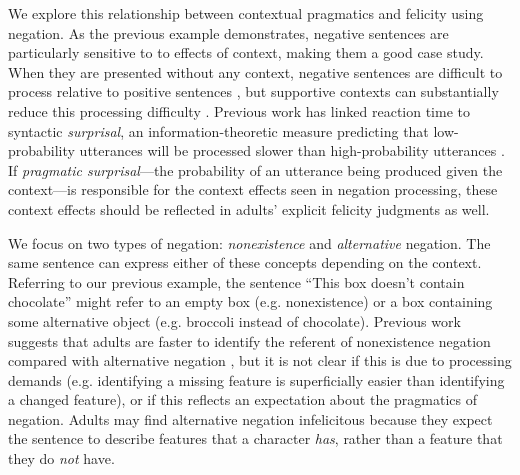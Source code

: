 \documentclass[10pt,letterpaper]{article}
\begin{document}
We explore this relationship between contextual pragmatics and felicity using negation. As the previous example demonstrates, negative sentences are particularly sensitive to to effects of context, making them a good case study.  When they are presented without any context, negative sentences are difficult to process relative to positive sentences \cite{hclark1972, carpenter1975, just1971, just1976}, but supportive contexts can substantially reduce this processing difficulty \cite{wason1965, glenberg1999, ludtke2006, nieuwland2008, dale2011, nordmeyer2014b}.   Previous work has linked reaction time to syntactic \emph{surprisal}, an information-theoretic measure predicting that low-probability utterances will be processed slower than high-probability utterances \cite{levy2008}.  If \emph{pragmatic surprisal}---the probability of an utterance being produced given the context---is responsible for the context effects seen in negation processing, these context effects should be reflected in adults' explicit felicity judgments as well.   %

We focus on two types of negation: \emph{nonexistence} and \emph{alternative} negation.  The same sentence can express either of these concepts depending on the context.  Referring to our previous example, the sentence ``This box doesn't contain chocolate'' might refer to an empty box (e.g. nonexistence) or a box containing some alternative object (e.g. broccoli instead of chocolate).  Previous work suggests that adults are faster to identify the referent of nonexistence negation compared with alternative negation \cite{nordmeyer2013, nordmeyer2014b}, but it is not clear if this is due to processing demands (e.g. identifying a missing feature is superficially easier than identifying a changed feature), or if this reflects an expectation about the pragmatics of negation.  Adults may find alternative negation infelicitous  because they expect the sentence to describe features that a character \emph{has}, rather than a feature that they do \emph{not} have.
\end{document}
